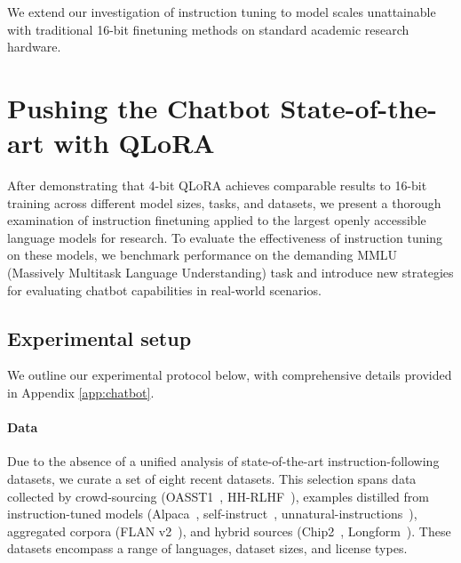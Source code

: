 We extend our investigation of instruction tuning to model scales unattainable with traditional 16-bit finetuning methods on standard academic research hardware.

\section{Pushing the Chatbot State-of-the-art with QLoRA}
\label{sec:pushing}
After demonstrating that 4-bit \textsc{QLoRA} achieves comparable results to 16-bit training across different model sizes, tasks, and datasets, we present a thorough examination of instruction finetuning applied to the largest openly accessible language models for research. To evaluate the effectiveness of instruction tuning on these models, we benchmark performance on the demanding MMLU (Massively Multitask Language Understanding) task and introduce new strategies for evaluating chatbot capabilities in real-world scenarios.

\subsection{Experimental setup} We outline our experimental protocol below, with comprehensive details provided in Appendix \ref{app:chatbot}.

\paragraph{Data} Due to the absence of a unified analysis of state-of-the-art instruction-following datasets, we curate a set of eight recent datasets. This selection spans data collected by crowd-sourcing (OASST1~\citep{kopf2023openassistant}, HH-RLHF~\citep{bai2022training}), examples distilled from instruction-tuned models (Alpaca~\citep{alpaca}, self-instruct~\citep{wang2022self}, unnatural-instructions~\citep{honovich2022unnatural}), aggregated corpora (FLAN v2~\citep{chung2022scaling}), and hybrid sources (Chip2~\citep{laion2023}, Longform~\citep{koksal2023longform}). These datasets encompass a range of languages, dataset sizes, and license types.

